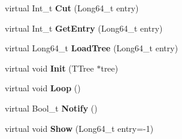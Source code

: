 \begin{DoxyCompactItemize}
\item 
\hypertarget{classanatree_af469e80902746c85deeab7a0e1b13b59}{virtual Int\-\_\-t {\bfseries Cut} (Long64\-\_\-t entry)}\label{classanatree_af469e80902746c85deeab7a0e1b13b59}

\item 
\hypertarget{classanatree_a3ead58a94b63a5af3188b31514693e39}{virtual Int\-\_\-t {\bfseries Get\-Entry} (Long64\-\_\-t entry)}\label{classanatree_a3ead58a94b63a5af3188b31514693e39}

\item 
\hypertarget{classanatree_aa7d2bc2d5c95833df9fe2aa61b1f78c9}{virtual Long64\-\_\-t {\bfseries Load\-Tree} (Long64\-\_\-t entry)}\label{classanatree_aa7d2bc2d5c95833df9fe2aa61b1f78c9}

\item 
\hypertarget{classanatree_a751a3a2b9b93761020d01def145f96a9}{virtual void {\bfseries Init} (T\-Tree $\ast$tree)}\label{classanatree_a751a3a2b9b93761020d01def145f96a9}

\item 
\hypertarget{classanatree_aeb7abde4f75491d634b4896255608029}{virtual void {\bfseries Loop} ()}\label{classanatree_aeb7abde4f75491d634b4896255608029}

\item 
\hypertarget{classanatree_a74d59c62b910973adb4f56454b644dd4}{virtual Bool\-\_\-t {\bfseries Notify} ()}\label{classanatree_a74d59c62b910973adb4f56454b644dd4}

\item 
\hypertarget{classanatree_aa20c82c0f6f2e8a8ff1ee5ae999aebb9}{virtual void {\bfseries Show} (Long64\-\_\-t entry=-\/1)}\label{classanatree_aa20c82c0f6f2e8a8ff1ee5ae999aebb9}

\end{DoxyCompactItemize}
